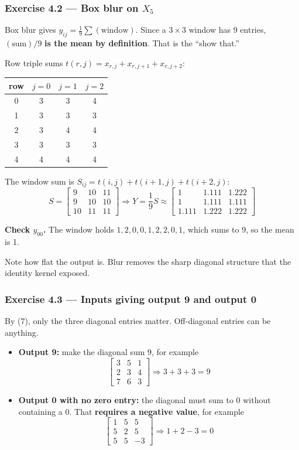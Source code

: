 \subsubsection*{Exercise 4.2 --- Box blur on $X_5$}

Box blur gives $y_{ij} = \frac{1}{9}\sum(\text{window})$. Since a $3\times3$ window has 9 entries, $(\text{sum})/9$ \textbf{is the mean by definition}. That is the ``show that.''

Row triple sums $t(r,j) = x_{r,j} + x_{r,j+1} + x_{r,j+2}$:

\begin{center}
\begin{tabular}{cccc}
\toprule
row & $j=0$ & $j=1$ & $j=2$ \\
\midrule
0 & 3 & 3 & 4 \\
1 & 3 & 3 & 3 \\
2 & 3 & 4 & 4 \\
3 & 3 & 3 & 3 \\
4 & 4 & 4 & 4 \\
\bottomrule
\end{tabular}
\end{center}

The window sum is $S_{ij} = t(i,j) + t(i+1,j) + t(i+2,j)$:
\[
S = \begin{bmatrix}9&10&11\\9&10&10\\10&11&11\end{bmatrix} \Rightarrow Y = \frac{1}{9}S \approx \begin{bmatrix}1&1.111&1.222\\1&1.111&1.111\\1.111&1.222&1.222\end{bmatrix}
\]

\textbf{Check $y_{00}$.} The window holds $1,2,0,0,1,2,2,0,1$, which sums to 9, so the mean is 1.

Note how flat the output is. Blur removes the sharp diagonal structure that the identity kernel exposed.

\subsubsection*{Exercise 4.3 --- Inputs giving output 9 and output 0}

By (7), only the three diagonal entries matter. Off-diagonal entries can be anything.
\begin{itemize}
  \item \textbf{Output 9:} make the diagonal sum 9, for example
  \[
  \begin{bmatrix}3&5&1\\2&3&4\\7&6&3\end{bmatrix} \Rightarrow 3+3+3 = 9
  \]
  \item \textbf{Output 0 with no zero entry:} the diagonal must sum to 0 without containing a 0. That \textbf{requires a negative value}, for example
  \[
  \begin{bmatrix}1&5&5\\5&2&5\\5&5&-3\end{bmatrix} \Rightarrow 1+2-3 = 0
  \]
\end{itemize}

